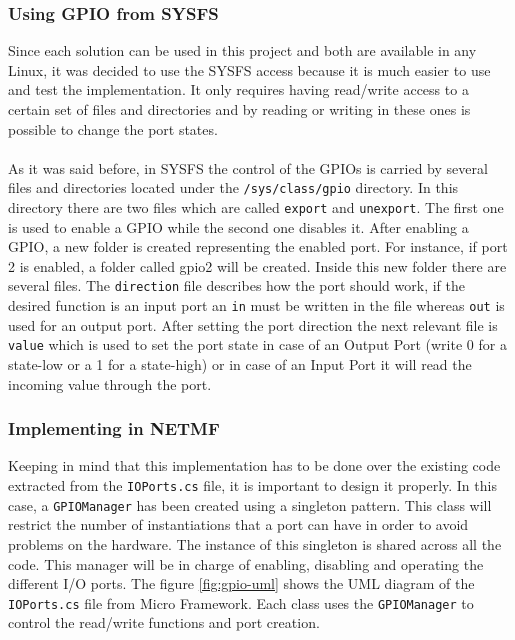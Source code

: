 \subsubsection{Using GPIO from SYSFS}\label{SSS:IOSharp-GPIO-SYSFS}
Since each solution can be used in this project and both are available in any Linux, it was decided to use the SYSFS access because it is much easier to use and test the implementation. It only requires having read/write access to a certain set of files and directories and by reading or writing in these ones is possible to change the port states.
\\
\\
As it was said before, in SYSFS the control of the GPIOs is carried by several files and directories located under the \verb!/sys/class/gpio! directory. In this directory there are two files which are called \verb!export! and \verb!unexport!. The first one is used to enable a GPIO while the second one disables it. After enabling a GPIO, a new folder is created representing the enabled port. For instance, if port 2 is enabled, a folder called gpio2 will be created. Inside this new folder there are several files. The \verb!direction! file describes how the port should work, if the desired function is an input port an \verb!in! must be written in the file whereas \verb!out! is used for an output port. After setting the port direction the next relevant file is \verb!value! which is used to set the port state in case of an Output Port (write 0 for a state-low or a 1 for a state-high) or in case of an Input Port it will read the incoming value through the port.

\subsubsection{Implementing in NETMF}\label{SSS:Implementing-GPIO-NETMF}
Keeping in mind that this implementation has to be done over the existing code extracted from the \verb!IOPorts.cs! file, it is important to design it properly. In this case, a \verb!GPIOManager! has been created using a singleton pattern. This class will restrict the number of instantiations that a port can have in order to avoid problems on the hardware. The instance of this singleton is shared across all the code. This manager will be in charge of enabling, disabling and operating the different I/O ports. The figure \ref{fig:gpio-uml} shows the UML diagram of the \verb!IOPorts.cs! file from Micro Framework. Each class uses the \verb!GPIOManager! to control the read/write functions and port creation.

